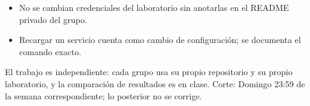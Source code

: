 \documentclass[11pt,a4paper]{article}
\begin{document}
\begin{itemize}[leftmargin=1.4em,itemsep=2pt,topsep=3pt]
  \item No se cambian credenciales del laboratorio sin anotarlas en el README privado del grupo.
  \item Recargar un servicio cuenta como cambio de configuración; se documenta el comando exacto.
\end{itemize}

\begin{cajaRecuerda}El trabajo es independiente: cada grupo usa su propio repositorio y su propio laboratorio, y la comparación de resultados es en clase. Corte: Domingo 23:59 de la semana correspondiente; lo posterior no se corrige.
\end{cajaRecuerda}
\end{document}
